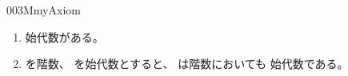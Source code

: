 \documentclass[index]{subfiles}
\begin{document}
\begin{myBlock}{003M}{myAxiom}
  \begin{enumerate}
  \item 始\myInlineMath{\myCircle}代数\myInlineMath{\myCircle \myElemOf
    \myCircleAlg{\myLevelZero}}がある。
  \item {}を階数、
    を始\myInlineMath{\myCircle}代数とすると、
    は階数においても
    始\myInlineMath{\myCircle}代数である。
  \end{enumerate}
\end{myBlock}
\end{document}
